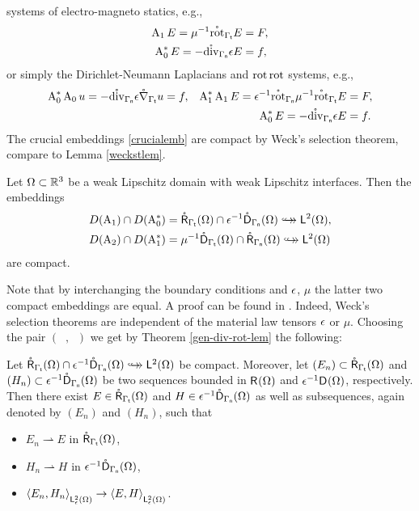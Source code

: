 \documentclass[a4paper]{amsart}
\newcommand{\wto}{\rightharpoonup}
\DeclareMathOperator{\Az}{A_{0}}
\DeclareMathOperator{\Azs}{A_{0}^{*}}
\DeclareMathOperator{\Ao}{A_{1}}
\DeclareMathOperator{\Aos}{A_{1}^{*}}
\DeclareMathOperator{\At}{A_{2}}
\newcommand{\grad}{\na}
\newcommand{\gradc}{\mathring\grad}
\renewcommand{\rotc}{\mathring\rot}
\renewcommand{\divc}{\mathring\div}
\newcommand{\cptemb}{\hookto\hspace*{-0.85em}\hookto}
\begin{document}
systems of electro-magneto statics, e.g.,
\begin{align*}
\A_{1}E=\mu^{-1}\rotc_{\gat}E&=F,\\
\A_{0}^{*}E=-\divc_{\gan}\eps E&=f,
\end{align*}
or simply the Dirichlet-Neumann Laplacians and $\operatorname{rot}\operatorname{rot}$ systems, e.g.,
\begin{align*}
\A_{0}^{*}\A_{0}u=-\divc_{\gan}\eps\gradc_{\gat}u&=f,
&
\A_{1}^{*}\A_{1}E=\eps^{-1}\rotc_{\gan}\mu^{-1}\rotc_{\gat}E&=F,\\
&&
\A_{0}^{*}E=-\divc_{\gan}\eps E&=f.
\end{align*}
The crucial embeddings \eqref{crucialemb}
are compact by Weck's selection theorem, compare to Lemma \ref{weckstlem}.

\begin{lem}
\label{weckstepsmulem}
Let $\Omega\subset\mathbb{R}^{3}$ be a weak Lipschitz domain with weak Lipschitz interfaces.
Then the embeddings
\begin{align*}
D(\Ao)\cap D(\Azs)&=\rcgatom\cap\eps^{-1}\dcganom\cptemb\ltom,\\
D(\At)\cap D(\Aos)&=\mu^{-1}\dcgatom\cap\rcganom\cptemb\ltom
\end{align*}
are compact.
\end{lem}

Note that by interchanging the boundary conditions and $\epsilon$, $\mu$
the latter two compact embeddings are equal.
A proof can be found in \cite[Theorem 4.7]{bauerpaulyschomburgmcpweaklip}.
Indeed, Weck's selection theorems are independent of the material law tensors $\epsilon$ or $\mu$.
Choosing the pair $(\Az,\Ao)$ we get by Theorem \ref{gen-div-rot-lem} the following:

\begin{theo}
Let $\rcgatom\cap\eps^{-1}\dcganom\cptemb\ltom$ be compact.
Moreover, let $(E_{n})\subset\mathring{\mathsf{R}}_{\Gamma_{\mathsf{t}}}(\Omega)$ and $(H_{n})\subset\epsilon^{-1}\mathring{\mathsf{D}}_{\Gamma_{\mathsf{n}}}(\Omega)$ 
be two sequences bounded in $\overset{}{\mathsf{R}}{}^{}_{}(\Omega)$ and $\epsilon^{-1}\overset{}{\mathsf{D}}{}^{}_{}(\Omega)$, respectively.
Then there exist $E\in\mathring{\mathsf{R}}_{\Gamma_{\mathsf{t}}}(\Omega)$ and $H\in\epsilon^{-1}\mathring{\mathsf{D}}_{\Gamma_{\mathsf{n}}}(\Omega)$ as well as subsequences, again denoted by $(E_{n})$ and $(H_{n})$, 
such that
\begin{itemize}
\item
$E_{n}\wto E$ in $\mathring{\mathsf{R}}_{\Gamma_{\mathsf{t}}}(\Omega)$,
\item
$H_{n}\wto H$ in $\epsilon^{-1}\mathring{\mathsf{D}}_{\Gamma_{\mathsf{n}}}(\Omega)$,
\item
$\langle E_{n},H_{n}\rangle_{\overset{}{\mathsf{L}}{}^{2}_{\epsilon}(\Omega)}\to\langle E,H\rangle_{\overset{}{\mathsf{L}}{}^{2}_{\epsilon}(\Omega)}$.
\end{itemize}
\end{theo}
\end{document}
